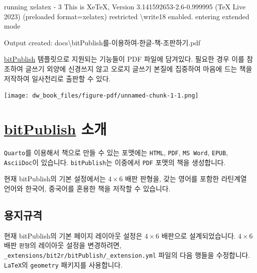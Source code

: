 \documentclass[
  letterpaper,
]{book}
\newenvironment{Shaded}{\begin{snugshade}}{\end{snugshade}}
\newcommand{\AttributeTok}[1]{\textcolor[rgb]{0.40,0.45,0.13}{#1}}
\newcommand{\DataTypeTok}[1]{\textcolor[rgb]{0.68,0.00,0.00}{#1}}
\newcommand{\ErrorTok}[1]{\textcolor[rgb]{0.68,0.00,0.00}{#1}}
\newcommand{\ExtensionTok}[1]{\textcolor[rgb]{0.00,0.23,0.31}{#1}}
\newcommand{\KeywordTok}[1]{\textcolor[rgb]{0.00,0.23,0.31}{#1}}
\newcommand{\NormalTok}[1]{\textcolor[rgb]{0.00,0.23,0.31}{#1}}
\begin{document}
\begin{Shaded}
\begin{Highlighting}[]
\ExtensionTok{running}\NormalTok{ xelatex }\AttributeTok{{-}}\NormalTok{ 3}
  \ExtensionTok{This}\NormalTok{ is XeTeX, Version 3.141592653{-}2.6{-}0.999995 }\ErrorTok{(}\ExtensionTok{TeX}\NormalTok{ Live 2023}\KeywordTok{)} \KeywordTok{(}\ExtensionTok{preloaded}\NormalTok{ format=xelatex}\KeywordTok{)}
   \ExtensionTok{restricted} \DataTypeTok{\textbackslash{}w}\NormalTok{rite18 enabled.}
  \ExtensionTok{entering}\NormalTok{ extended mode}


\ExtensionTok{Output}\NormalTok{ created: docs}\DataTypeTok{\textbackslash{}b}\NormalTok{itPublish를{-}이용하여{-}한글{-}책{-}조판하기.pdf}
\end{Highlighting}
\end{Shaded}

\href{https://github.com/bit2r/bitPublish}{bitPublish} 템플릿으로
지원되는 기능들이 PDF 파일에 담겨있다. 필요한 경우 이를 참조하여 글쓰기
외양에 신경쓰지 않고 오로지 글쓰기 본질에 집중하여 마음에 드는 책을
저작하여 일사천리로 출판할 수 있다.

\texttt{[image: dw\_book\_files/figure-pdf/unnamed-chunk-1-1.png]}

\hypertarget{bitpublish-uxc18cuxac1c}{%
\section{\texorpdfstring{\href{https://github.com/bit2r/bitPublish}{bitPublish}
소개}{bitPublish 소개}}\label{bitpublish-uxc18cuxac1c}}

\texttt{Quarto}를 이용해서 책으로 만들 수 있는 포맷에는 \texttt{HTML},
\texttt{PDF}, \texttt{MS\ Word}, \texttt{EPUB}, \texttt{AsciiDoc}이
있습니다. \texttt{bitPublish}는 이중에서 \texttt{PDF} 포맷의 책을
생성합니다.

현재 bitPublish의 기본 설정에서는 \(4\times6\) 배판 판형을, 갖는 영어를
포함한 라틴계열 언어와 한국어, 중국어를 혼용한 책을 저작할 수 있습니다.

\hypertarget{uxc6a9uxc9c0uxaddcuxaca9}{%
\subsection{용지규격}\label{uxc6a9uxc9c0uxaddcuxaca9}}

현재 bitPublish의 기본 페이지 레이아웃 설정은
\(4\times6\) 배판으로 설계되었습니다. \(4\times6\) 배판
\texttt{판형}의 레이아웃 설정을 변경하려면,
\texttt{\_extensions/bit2r/bitPublish/\_extension.yml} 파일의 다음
행들을 수정합니다. \texttt{LaTeX}의 \texttt{geometry}
패키지를 사용합니다.
\end{document}
